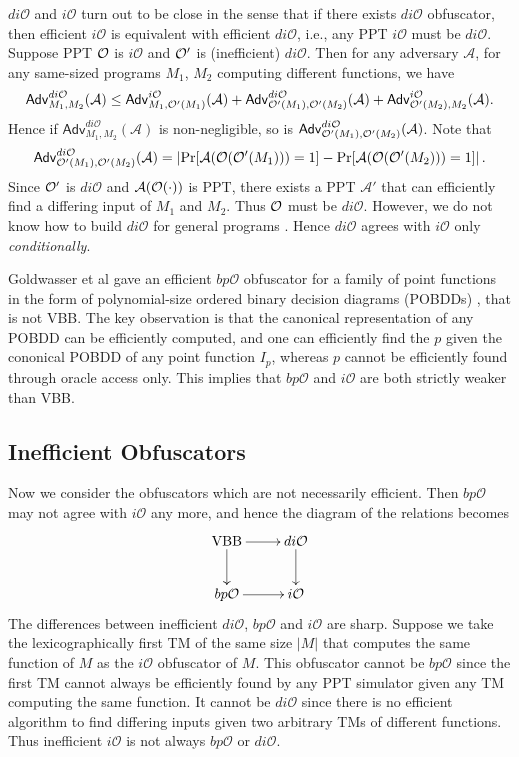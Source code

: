 \documentclass[12pt]{article}
\newcommand{\A}{\mathcal{A}}
\newcommand{\Adv}{\mathsf{Adv}}
\newcommand{\io}{i\mathcal{O}}
\newcommand{\dio}{di\mathcal{O}}
\newcommand{\bpo}{bp\mathcal{O}}
\theoremstyle{definition}
\begin{document}
$\dio$ and $\io$ turn out to be close in the sense that if there exists $\dio$ obfuscator, then efficient $\io$ is equivalent with efficient $\dio$, i.e., any PPT $\io$ must be $\dio$. Suppose PPT $\mathcal{O}$ is $\io$ and $\mathcal{O}'$ is (inefficient) $\dio$. Then for any adversary $\A$, for any same-sized programs $M_1$, $M_2$ computing different functions, we have
$$\Adv_{M_1,M_2}^{\dio}(\A) \leq \Adv_{M_1,\bigoh'(M_1)}^{\io}(\A) + \Adv_{\bigoh'(M_1),\bigoh'(M_2)}^{\dio}(\A) + \Adv_{\bigoh'(M_2),M_2}^{\io}(\A).$$
Hence if $\Adv_{M_1,M_2}^{\dio}(\A)$ is non-negligible, so is $\Adv_{\bigoh'(M_1),\bigoh'(M_2)}^{\dio}(\A)$.
Note that
$$\Adv_{\bigoh'(M_1),\bigoh'(M_2)}^{\dio}(\A) = \left| \Pr[\A(\bigoh(\bigoh'(M_1)))=1] - \Pr[\A(\bigoh(\bigoh'(M_2)))=1] \right|.$$
Since $\mathcal{O}'$ is $\dio$ and $\A(\bigoh(\cdot))$ is PPT, there exists a PPT $\A'$ that can efficiently find a differing input of $M_1$ and $M_2$. Thus $\mathcal{O}$ must be $\dio$. However, we do not know how to build $\dio$ for general programs \cite{garg2014implausibility}. Hence $\dio$ agrees with $\io$ only \emph{conditionally}.

Goldwasser et al \cite{goldwasser2007best} gave an efficient $\bpo$ obfuscator for a family of point functions in the form of polynomial-size ordered binary decision diagrams (POBDDs) \cite{bryant1986graph}, that is not VBB. The key observation is that the canonical representation of any POBDD can be efficiently computed, and one can efficiently find the $p$ given the cononical POBDD of any point function $I_p$, whereas $p$ cannot be efficiently found through oracle access only. This implies that $\bpo$ and $\io$ are both strictly weaker than VBB.

\subsection{Inefficient Obfuscators}
Now we consider the obfuscators which are not necessarily efficient. Then $\bpo$ may not agree with $\io$ any more, and hence the diagram of the relations becomes
$$
\xymatrix{
\mathrm{VBB} \ar[r] \ar[d] & \dio \ar[d] \\
\bpo \ar[r] & \io }
$$
The differences between inefficient $\dio$, $\bpo$ and $\io$ are sharp. Suppose we take the lexicographically first TM of the same size $|M|$ that computes the same function of $M$ as the $\io$ obfuscator of $M$. This obfuscator cannot be $\bpo$ since the first TM cannot always be efficiently found by any PPT simulator given any TM computing the same function. It cannot be $\dio$ since there is no efficient algorithm to find differing inputs given two arbitrary TMs of different functions. Thus inefficient $\io$ is not always $\bpo$ or $\dio$.
\end{document}
